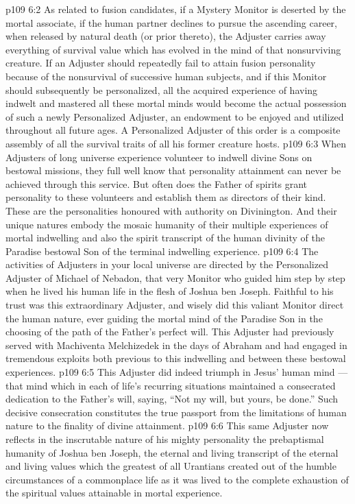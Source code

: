 \vs p109 6:2 As related to fusion candidates, if a Mystery Monitor is deserted by the mortal associate, if the human partner declines to pursue the ascending career, when released by natural death (or prior thereto), the Adjuster carries away everything of survival value which has evolved in the mind of that nonsurviving creature. If an Adjuster should repeatedly fail to attain fusion personality because of the nonsurvival of successive human subjects, and if this Monitor should subsequently be personalized, all the acquired experience of having indwelt and mastered all these mortal minds would become the actual possession of such a newly Personalized Adjuster, an endowment to be enjoyed and utilized throughout all future ages. A Personalized Adjuster of this order is a composite assembly of all the survival traits of all his former creature hosts.
\vs p109 6:3 When Adjusters of long universe experience volunteer to indwell divine Sons on bestowal missions, they full well know that personality attainment can never be achieved through this service. But often does the Father of spirits grant personality to these volunteers and establish them as directors of their kind. These are the personalities honoured with authority on Divinington. And their unique natures embody the mosaic humanity of their multiple experiences of mortal indwelling and also the spirit transcript of the human divinity of the Paradise bestowal Son of the terminal indwelling experience.
\vs p109 6:4 The activities of Adjusters in your local universe are directed by the Personalized Adjuster of Michael of Nebadon, that very Monitor who guided him step by step when he lived his human life in the flesh of Joshua ben Joseph. Faithful to his trust was this extraordinary Adjuster, and wisely did this valiant Monitor direct the human nature, ever guiding the mortal mind of the Paradise Son in the choosing of the path of the Father’s perfect will. This Adjuster had previously served with Machiventa Melchizedek in the days of Abraham and had engaged in tremendous exploits both previous to this indwelling and between these bestowal experiences.
\vs p109 6:5 This Adjuster did indeed triumph in Jesus’ human mind --- that mind which in each of life’s recurring situations maintained a consecrated dedication to the Father’s will, saying, “Not my will, but yours, be done.” Such decisive consecration constitutes the true passport from the limitations of human nature to the finality of divine attainment.
\vs p109 6:6 This same Adjuster now reflects in the inscrutable nature of his mighty personality the prebaptismal humanity of Joshua ben Joseph, the eternal and living transcript of the eternal and living values which the greatest of all Urantians created out of the humble circumstances of a commonplace life as it was lived to the complete exhaustion of the spiritual values attainable in mortal experience.

